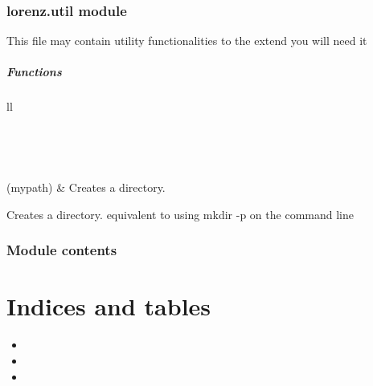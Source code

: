 \documentclass[letterpaper,10pt,english]{sphinxmanual}
\begin{document}
\subsection{lorenz.util module}
\label{_autosummary/lorenz:module-lorenz.util}\label{_autosummary/lorenz:lorenz-util-module}
This file may contain utility functionalities to the extend you will need it
\paragraph{Functions}

\begin{longtable}{ll}
\hline
\endfirsthead

%
{{}} \\
\hline
\endhead

\hline {} \\ \hline
\endfoot

\endlastfoot


{\hyperref[_autosummary/lorenz:lorenz.util.mkdir_p]{}}(mypath)
 & 
Creates a directory.
\\
\hline\end{longtable}


\begin{fulllineitems}
\label{_autosummary/lorenz:lorenz.util.mkdir_p}
Creates a directory. equivalent to using mkdir -p on the command line

\end{fulllineitems}



\subsection{Module contents}
\label{_autosummary/lorenz:module-lorenz}\label{_autosummary/lorenz:module-contents}

\chapter{Indices and tables}
\label{index:indices-and-tables}\begin{itemize}
\item {} 

\item {} 

\item {} 

\end{itemize}
\end{document}
